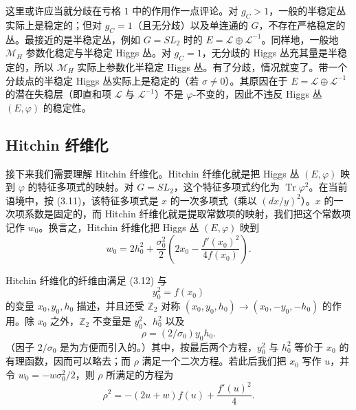 这里或许应当就分歧在亏格 $1$ 中的作用作一点评论。对 $g_C>1$，一般的半稳定丛实际上是稳定的；但对 $g_C=1$（且无分歧）以及单连通的 $G$，不存在严格稳定的丛。最接近的是半稳定丛，例如 $G=SL_2$ 时的 $E=\mathcal{L}\oplus\mathcal{L}^{-1}$。同样地，一般地 $\mathcal{M}_H$ 参数化稳定与半稳定 Higgs 丛。对 $g_C=1$，无分歧的 Higgs 丛充其量是半稳定的，所以 $\mathcal{M}_H$ 实际上参数化半稳定 Higgs 丛。有了分歧，情况就变了。带一个分歧点的半稳定 Higgs 丛实际上是稳定的（若 $\sigma\ne 0$）。其原因在于 $E=\mathcal{L}\oplus\mathcal{L}^{-1}$ 的潜在失稳层（即直和项 $\mathcal{L}$ 与 $\mathcal{L}^{-1}$）不是 $\varphi$-不变的，因此不违反 Higgs 丛 $(E,\varphi)$ 的稳定性。

\subsection{Hitchin 纤维化}

接下来我们需要理解 Hitchin 纤维化。Hitchin 纤维化就是把 Higgs 丛 $(E,\varphi)$ 映到 $\varphi$ 的特征多项式的映射。对 $G=SL_2$，这个特征多项式约化为 $\operatorname{Tr}\varphi^2$。在当前语境中，按 (3.11)，该特征多项式是 $x$ 的一次多项式（乘以 $(dx/y)^2$）。$x$ 的一次项系数是固定的，而 Hitchin 纤维化就是提取常数项的映射，我们把这个常数项记作 $w_0$。换言之，Hitchin 纤维化把 Higgs 丛 $(E,\varphi)$ 映到
\begin{equation}\tag{3.12}
w_0=2h_0^2+\frac{\sigma_0^2}{2}\left(2x_0-\frac{f'(x_0)^2}{4f(x_0)}\right).
\end{equation}


Hitchin 纤维化的纤维由满足 (3.12) 与
\begin{equation}\tag{3.13}
y_0^2=f(x_0)
\end{equation}
的变量 $x_0,y_0,h_0$ 描述，并且还受 $\mathbb{Z}_2$ 对称 $(x_0,y_0,h_0)\to(x_0,-y_0,-h_0)$ 的作用。除 $x_0$ 之外，$\mathbb{Z}_2$ 不变量是 $y_0^2$、$h_0^2$ 以及
\begin{equation}\tag{3.14}
\rho=(2/\sigma_0)y_0h_0.
\end{equation}
（因子 $2/\sigma_0$ 是为方便而引入的。）其中，按最后两个方程，$y_0^2$ 与 $h_0^2$ 等价于 $x_0$ 的有理函数，因而可以略去；而 $\rho$ 满足一个二次方程。若此后我们把 $x_0$ 写作 $u$，并令 $w_0=-w\sigma_0^2/2$，则 $\rho$ 所满足的方程为
\begin{equation}\tag{3.15}
\rho^2=-(2u+w)f(u)+\frac{f'(u)^2}{4}.
\end{equation}

